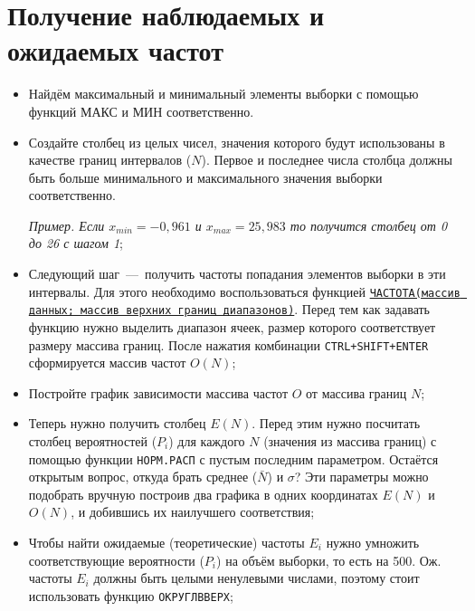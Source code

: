 \documentclass[14pt,a4paper]{article}
\begin{document}
\section{Получение наблюдаемых и ожидаемых частот}	
\begin{itemize}
	\item Найдём максимальный и минимальный элементы выборки с помощью функций МАКС и МИН соответственно. 
	\item Создайте столбец из целых чисел, значения которого будут использованы в качестве границ интервалов ($N$). Первое и последнее числа столбца должны быть больше минимального и максимального значения выборки соответственно. 
	
	\textit{Пример. Если $x_{min} = -0,961$ и $x_{max} = 25,983$ то получится столбец от 0 до 26 с шагом 1};

	\item Следующий шаг~---~получить частоты попадания элементов выборки в эти интервалы. Для этого необходимо воспользоваться функцией \href{https://support.microsoft.com/ru-ru/office/%D1%84%D1%83%D0%BD%D0%BA%D1%86%D0%B8%D1%8F-%D1%87%D0%B0%D1%81%D1%82%D0%BE%D1%82%D0%B0-44e3be2b-eca0-42cd-a3f7-fd9ea898fdb9}{\texttt{ЧАСТОТА(массив данных; массив верхних границ диапазонов)}}. Перед тем как задавать функцию нужно выделить диапазон ячеек, размер которого соответствует размеру массива границ. После нажатия комбинации \texttt{CTRL+SHIFT+ENTER} сформируется массив частот $O(N)$;
	\item Постройте график зависимости массива частот $O$ от массива границ $N$;
	\item Теперь нужно получить столбец $E(N)$. Перед этим нужно посчитать столбец вероятностей  ($P_i$) для каждого $N$ (значения из массива границ) с помощью функции \texttt{НОРМ.РАСП} с пустым последним параметром. Остаётся открытым вопрос, откуда брать среднее ($\bar{N}$) и $\sigma$? Эти параметры можно подобрать вручную построив два графика в одних координатах $E(N)$ и $O(N)$, и добившись их наилучшего соответствия;
	\item Чтобы найти ожидаемые (теоретические) частоты $E_i$ нужно умножить соответствующие вероятности ($P_i$) на объём выборки, то есть на 500. Ож. частоты $E_i$ должны быть целыми ненулевыми числами, поэтому стоит использовать функцию \texttt{ОКРУГЛВВЕРХ};
\end{itemize}
\end{document}
